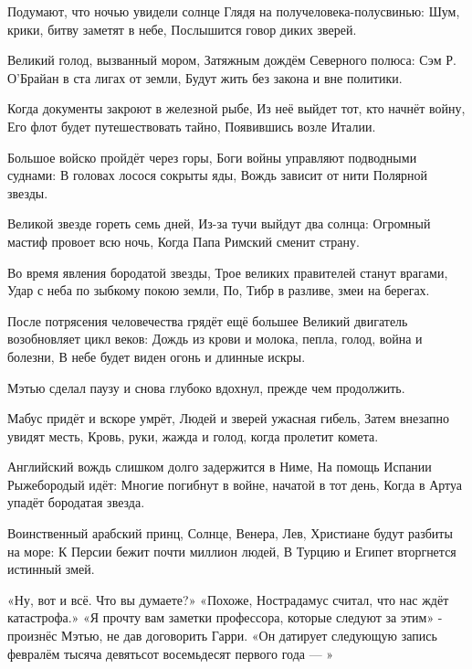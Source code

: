\documentclass[a4paper,12pt]{book}
\begin{document}
	Подумают, что ночью увидели солнце
	Глядя на получеловека-полусвинью:
	Шум, крики, битву заметят в небе,
	Послышится говор диких зверей.

	Великий голод, вызванный мором,
	Затяжным дождём Северного полюса:
	Сэм Р. О’Брайан в ста лигах от земли,
	Будут жить без закона и вне политики.

	Когда документы закроют в железной рыбе,
	Из неё выйдет тот, кто начнёт войну,
	Его флот будет путешествовать тайно,
	Появившись возле Италии.

	Большое войско пройдёт через горы,
	Боги войны управляют подводными суднами:
	В головах лосося сокрыты яды,
	Вождь зависит от нити Полярной звезды.

	Великой звезде гореть семь дней,
	Из-за тучи выйдут два солнца:
	Огромный мастиф провоет всю ночь,
	Когда Папа Римский сменит страну.

	Во время явления бородатой звезды,
	Трое великих правителей станут врагами,
	Удар с неба по зыбкому покою земли,
	По, Тибр в разливе, змеи на берегах.

	После потрясения человечества грядёт ещё большее
	Великий двигатель возобновляет цикл веков:
	Дождь из крови и молока, пепла, голод, война и болезни,
	В небе будет виден огонь и длинные искры.

	Мэтью сделал паузу и снова глубоко вдохнул, прежде чем продолжить.

	Мабус придёт и вскоре умрёт,
	Людей и зверей ужасная гибель,
	Затем внезапно увидят месть,
	Кровь, руки, жажда и голод, когда пролетит комета.

	Английский вождь слишком долго задержится в Ниме,
	На помощь Испании Рыжебородый идёт:
	Многие погибнут в войне, начатой в тот день,
	Когда в Артуа упадёт бородатая звезда.

	Воинственный арабский принц, Солнце, Венера, Лев,
	Христиане будут разбиты на море:
	К Персии бежит почти миллион людей,
	В Турцию и Египет вторгнется истинный змей.

	«Ну, вот и всё. Что вы думаете?»
	«Похоже, Нострадамус считал, что нас ждёт катастрофа.»
	«Я прочту вам заметки профессора, которые следуют за этим» - произнёс Мэтью, не дав договорить Гарри.
	«Он датирует следующую запись февралём тысяча девятьсот восемьдесят первого года — »
\end{document}

